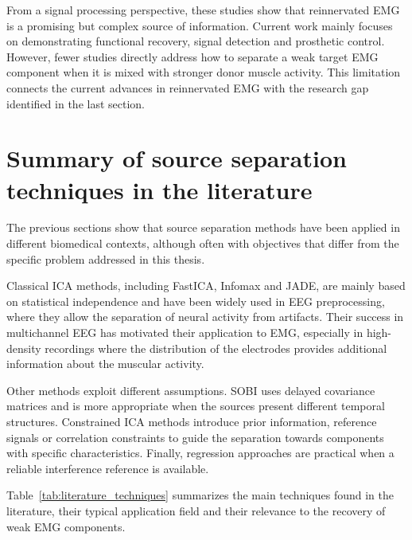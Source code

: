 From a signal processing perspective, these studies show that reinnervated EMG is
a promising but complex source of information. Current work mainly focuses on
demonstrating functional recovery, signal detection and prosthetic control. However, fewer studies directly address how to separate a weak target
EMG component when it is mixed with stronger donor muscle
activity. This limitation connects the current advances in reinnervated EMG with
the research gap identified in the last section.
\clearpage
\section{Summary of source separation techniques in the literature}

The previous sections show that source separation methods have been applied in
different biomedical contexts, although often with objectives that differ from the
specific problem addressed in this thesis.

Classical ICA methods, including FastICA, Infomax and JADE, are mainly based on
statistical independence and have been widely used in EEG preprocessing, where
they allow the separation of neural activity from artifacts. Their success in
multichannel EEG has motivated their application to EMG, especially in
high-density recordings where the distribution of the electrodes provides
additional information about the muscular activity.

Other methods exploit different assumptions. SOBI uses delayed covariance
matrices and is more appropriate when the sources present different
temporal structures. Constrained ICA methods introduce prior information,
reference signals or correlation constraints to guide the separation towards
components with specific characteristics. Finally, regression  approaches are practical when a reliable interference reference is available.

Table~\ref{tab:literature_techniques} summarizes the main techniques found in the
literature, their typical application field and their relevance to the recovery
of weak EMG components.

